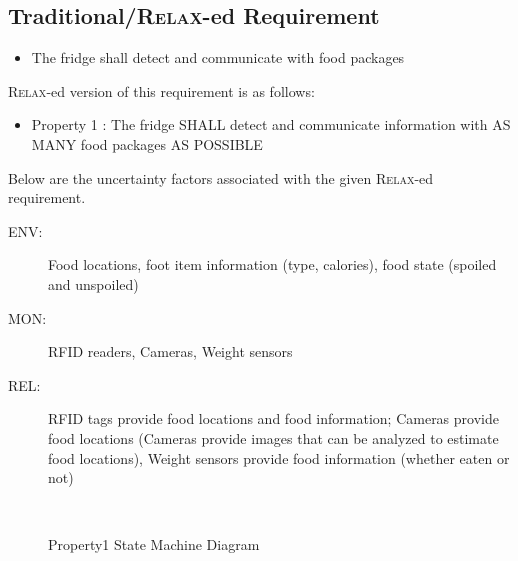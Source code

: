 \documentclass[a4paper,twoside]{article}
\def\myrelax{\textsc{Relax}}                  %
\begin{document}
\subsection{Traditional/\myrelax{}-ed Requirement}

\begin{itemize}
\item The fridge shall detect and communicate with food packages
\end{itemize}

\myrelax{}-ed version of this requirement is as follows:

\begin{itemize}
\item Property 1 : The fridge SHALL detect and communicate information with AS MANY food packages AS POSSIBLE
\end{itemize}


Below are the uncertainty factors associated with the given \myrelax{}-ed requirement.

\begin{description}
\item[ENV:] Food locations, foot item information (type, calories), food state (spoiled and unspoiled)
\item[MON:] RFID readers, Cameras, Weight sensors
\item[REL:] RFID tags provide food locations and food information; Cameras provide food locations (Cameras provide images that can be analyzed to estimate food locations), Weight sensors provide food information (whether eaten or not)
\end{description}

\begin{figure}[!h]
  \vspace{8cm}~
  \centering
  {}
  \caption{Property1 State Machine Diagram}
  \label{fig:property1stm}
 \end{figure}
\end{document}
